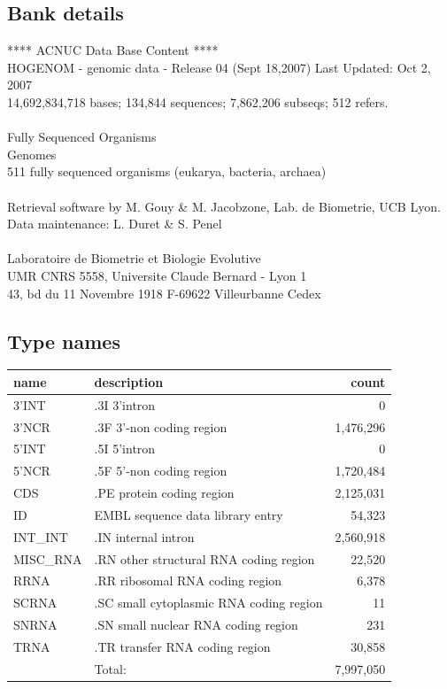 \documentclass{article}
\begin{document}
\begin{Schunk}
\subsection{Bank details}
               ****     ACNUC Data Base Content      ****                      \\
 HOGENOM - genomic data - Release 04 (Sept 18,2007) Last Updated: Oct  2, 2007\\
14,692,834,718 bases; 134,844 sequences; 7,862,206 subseqs; 512 refers.\\
                                                                               \\
                        Fully Sequenced Organisms\\
   				Genomes \\
	  511 fully sequenced organisms (eukarya, bacteria, archaea)\\
\\
Retrieval software by M. Gouy \& M. Jacobzone, Lab. de Biometrie, UCB Lyon.\\
Data maintenance: L. Duret \& S. Penel\\
\\
Laboratoire de Biometrie et Biologie Evolutive\\
UMR CNRS 5558, Universite Claude Bernard - Lyon 1 \\
43, bd du 11 Novembre 1918 F-69622 Villeurbanne Cedex\\


\subsection{Type names}
\noindent\begin{tabular}{llr}
\hline \hline
name & description & count \\
\hline
3'INT  &  .3I 3'intron  &  0 \\
3'NCR  &  .3F  3'-non coding region  &  1,476,296 \\
5'INT  &  .5I 5'intron  &  0 \\
5'NCR  &  .5F  5'-non coding region  &  1,720,484 \\
CDS  &  .PE protein coding region  &  2,125,031 \\
ID  &  EMBL sequence data library entry  &  54,323 \\
INT\_INT  &  .IN  internal intron  &  2,560,918 \\
MISC\_RNA  &  .RN other structural RNA coding region  &  22,520 \\
RRNA  &  .RR ribosomal RNA coding region  &  6,378 \\
SCRNA  &  .SC small cytoplasmic RNA coding region  &  11 \\
SNRNA  &  .SN small nuclear RNA coding region  &  231 \\
TRNA  &  .TR transfer RNA coding region  &  30,858 \\
\hline
 & Total: & 7,997,050 \\
\hline \hline
\end{tabular}


\end{Schunk}
\end{document}
